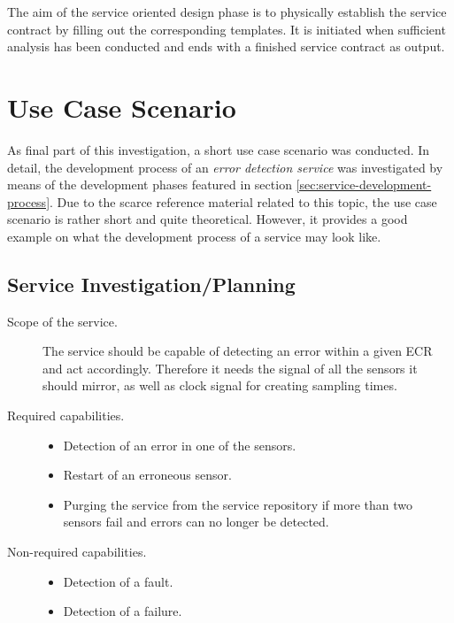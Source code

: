 The aim of the service oriented design phase is to physically establish the service contract by filling out the corresponding templates. It is initiated when sufficient analysis has been conducted and ends with a finished service contract as output.








\section{Use Case Scenario}

As final part of this investigation, a short use case scenario was conducted. In detail, the development process of an \emph{error detection service} was investigated by means of the development phases featured in section \ref{sec:service-development-process}. Due to the scarce reference material related to this topic, the use case scenario is rather short and quite theoretical. However, it provides a good example on what the development process of a service may look like.

\subsection{Service Investigation/Planning}


\begin{description}
\item [Scope of the service.]
The service should be capable of detecting an error within a given ECR and act accordingly. Therefore it needs the signal of all the sensors it should mirror, as well as clock signal for creating sampling times.
\item [Required capabilities.]
	\begin{itemize}
	\item Detection of an error in one of the sensors.
	\item Restart of an erroneous sensor.
	\item Purging the service from the service repository if more than two sensors fail and errors can no longer be detected.
	\end{itemize}
\item [Non-required capabilities.]
	\begin{itemize}
	\item Detection of a fault.
	\item Detection of a failure.
	\end{itemize}
\end{description}



